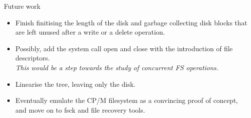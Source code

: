 \documentclass{beamer}
\begin{document}
\begin{frame}{Future work}
  \begin{itemize}
  \item Finish finitising the length of the disk and garbage
    collecting disk blocks that are left unused after a write or a delete
    operation.
  \item Possibly, add the system call open and close with the
    introduction of file descriptors.\\
    \textit{This would be a step towards the study of concurrent FS operations.}
  \item Linearise the tree, leaving only the disk.
  \item Eventually emulate the CP/M filesystem as a convincing proof
    of concept, and move on to fsck and file recovery tools.
  \end{itemize}
\end{frame}
\end{document}
